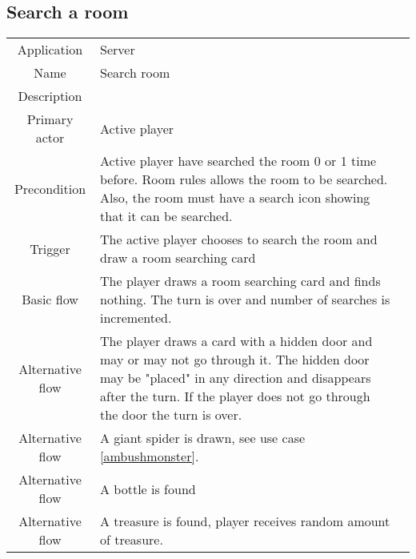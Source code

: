 \subsection{Search a room}
\label{searchroom}
\begin{tabular}{|c| p{9cm}|c}
\hline
Application & Server \\
Name & Search room \\
Description &  \\
Primary actor & Active player \\
Precondition & Active player have searched the room 0 or 1 time before. Room rules allows the room to be searched. Also, the room must have a search icon showing that it can be searched.  \\
Trigger & The active player chooses to search the room and draw a room searching card  \\ \hline
Basic flow & The player draws a room searching card and finds nothing. The turn is over and number of searches is incremented. \\ \hline
Alternative flow & The player draws a card with a hidden door and may or may not go through it. The hidden door may be "placed" in any direction and disappears after the turn. If the player does not go through the door the turn is over. \\\hline
Alternative flow & A giant spider is drawn, see use case \ref{ambushmonster}. \\ \hline
Alternative flow & A bottle is found \\ \hline
Alternative flow & A treasure is found, player receives random amount of treasure. \\
\hline
\end{tabular}

